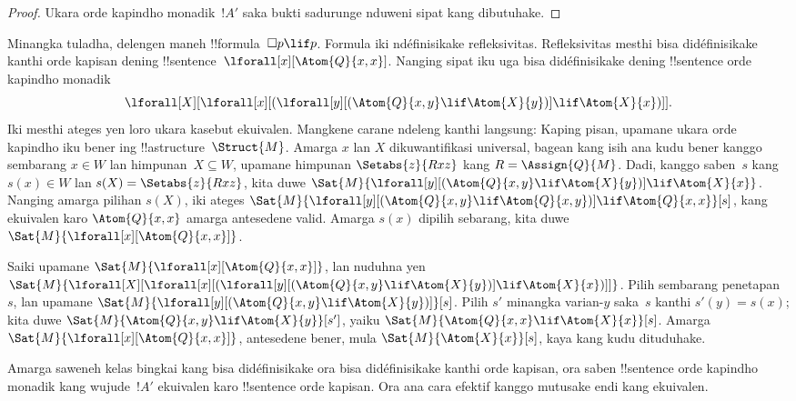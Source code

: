 \documentclass[../../../include/open-logic-section]{subfiles}
\begin{document}
\begin{proof}
  Ukara orde kapindho monadik~$!A'$ saka bukti sadurunge nduweni
  sipat kang dibutuhake.
\end{proof}

Minangka tuladha, delengen maneh !!{formula}~$\Box p \lif p$.
Formula iki ndéfinisikake refleksivitas. Refleksivitas mesthi bisa
didéfinisikake kanthi orde kapisan dening !!{sentence}~$\lforall[x][\Atom{Q}{x,x}]$.
Nanging sipat iku uga bisa didéfinisikake dening !!{sentence} orde
kapindho monadik
\[
\lforall[X][\lforall[x][(\lforall[y][(\Atom{Q}{x,y} \lif \Atom{X}{y})]
    \lif \Atom{X}{x})]].
\]
Iki mesthi ateges yen loro ukara kasebut ekuivalen. Mangkene carane
ndeleng kanthi langsung: Kaping pisan, upamane ukara orde kapindho
iku bener ing !!a{structure}~$\Struct{M}$. Amarga $x$ lan $X$
dikuwantifikasi universal, bagean kang isih ana kudu bener kanggo
sembarang $x \in W$ lan himpunan~$X \subseteq W$, upamane himpunan
$\Setabs{z}{Rxz}$ kang $R = \Assign{Q}{M}$. Dadi, kanggo saben~$s$
kang $s(x) \in W$ lan $s(X) = \Setabs{z}{Rxz}$, kita duwe
$\Sat{M}{\lforall[y][(\Atom{Q}{x,y} \lif
    \Atom{X}{y})] \lif \Atom{X}{x}}$. Nanging amarga pilihan
$s(X)$, iki ateges $\Sat{M}{\lforall[y][(\Atom{Q}{x,y} \lif
    \Atom{Q}{x,y})] \lif \Atom{Q}{x,x}}[s]$, kang ekuivalen karo
$\Atom{Q}{x,x}$ amarga antesedene valid. Amarga $s(x)$ dipilih
sebarang, kita duwe $\Sat{M}{\lforall[x][\Atom{Q}{x,x}]}$.

Saiki upamane $\Sat{M}{\lforall[x][\Atom{Q}{x,x}]}$, lan
nuduhna yen
$\Sat{M}{\lforall[X][\lforall[x][(\lforall[y][(\Atom{Q}{x,y} \lif
        \Atom{X}{y})] \lif \Atom{X}{x})]]}$. Pilih sembarang
penetapan~$s$, lan upamane $\Sat{M}{\lforall[y][(\Atom{Q}{x,y} \lif
    \Atom{X}{y})]}[s]$. Pilih $s'$ minangka varian-$y$ saka~$s$
kanthi $s'(y) = s(x)$; kita duwe
$\Sat{M}{\Atom{Q}{x,y} \lif \Atom{X}{y}}[s']$, yaiku
$\Sat{M}{\Atom{Q}{x,x} \lif \Atom{X}{x}}[s]$. Amarga
$\Sat{M}{\lforall[x][\Atom{Q}{x,x}]}$, antesedene bener, mula
$\Sat{M}{\Atom{X}{x}}[s]$, kaya kang kudu dituduhake.

Amarga saweneh kelas bingkai kang bisa didéfinisikake
ora bisa didéfinisikake kanthi orde kapisan, ora saben
!!{sentence} orde kapindho monadik kang wujude~$!A'$ ekuivalen
karo !!{sentence} orde kapisan. Ora ana cara efektif kanggo mutusake
endi kang ekuivalen.
\end{document}
